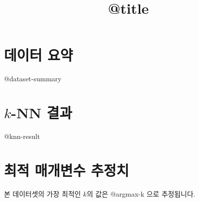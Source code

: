 \documentclass[a4paper]{article}
\title{@title}
\begin{document}
    \maketitle
    \section{데이터 요약}
    @dataset-summary

    \section{$k$-NN 결과}
    @knn-result

    \section{최적 매개변수 추정치}
    본 데이터셋의 가장 최적인 $k$의 값은 @argmax-k 으로 추정됩니다.
\end{document}
